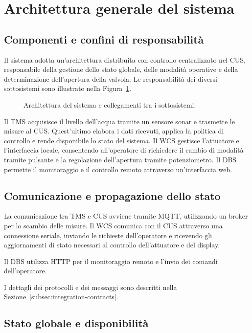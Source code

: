 \section{Architettura generale del sistema}
\label{sec:architecture}

\subsection{Componenti e confini di responsabilità}

Il sistema adotta un'architettura distribuita con controllo centralizzato nel CUS, responsabile della gestione dello stato globale, delle modalità operative e della determinazione dell'apertura della valvola.
Le responsabilità dei diversi sottosistemi sono illustrate nella Figura~\ref{fig:architecture}.

\begin{figure}[htbp]
\centering

\caption{Architettura del sistema e collegamenti tra i sottosistemi.}
\label{fig:architecture}
\end{figure}

Il TMS acquisisce il livello dell'acqua tramite un sensore sonar e trasmette le misure al CUS.
Quest'ultimo elabora i dati ricevuti, applica la politica di controllo e rende disponibile lo stato del sistema.
Il WCS gestisce l'attuatore e l'interfaccia locale, consentendo all'operatore di richiedere il cambio di modalità tramite pulsante e la regolazione dell'apertura tramite potenziometro.
Il DBS permette il monitoraggio e il controllo remoto attraverso un'interfaccia web.

\subsection{Comunicazione e propagazione dello stato}

La comunicazione tra TMS e CUS avviene tramite MQTT, utilizzando un broker per lo scambio delle misure.
Il WCS comunica con il CUS attraverso una connessione seriale, inviando le richieste dell'operatore e ricevendo gli aggiornamenti di stato necessari al controllo dell'attuatore e del display.

Il DBS utilizza HTTP per il monitoraggio remoto e l'invio dei comandi dell'operatore.

I dettagli dei protocolli e dei messaggi sono descritti nella Sezione~\ref{subsec:integration-contracts}.

\subsection{Stato globale e disponibilità}

